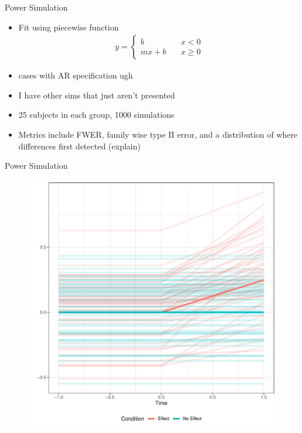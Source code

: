 \documentclass{beamer}
\begin{document}
\begin{frame}{Power Simulation}
\begin{itemize}
\item Fit using piecewise function
\begin{align*}
y = \begin{cases}
b \quad &x < 0 \\
mx + b \quad &x \geq 0
\end{cases}
\end{align*}
\item cases with AR specification ugh
\item I have other sims that just aren't presented
\item 25 subjects in each group, 1000 simulations
\item Metrics include FWER, family wise type II error, and a distribution of where differences first detected (explain)
\end{itemize}
\end{frame}

\begin{frame}{Power Simulation}
\begin{figure}
\centering
\includegraphics[scale = 0.4]{piecewise_distribution.pdf}
\end{figure}
\end{frame}
\end{document}
